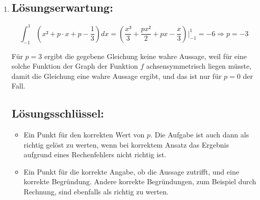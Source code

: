 \begin{langesbeispiel}
{\begin{enumerate}
		Es gilt: $\frac{p²}{4}+1>\frac{p²}{4}$ und somit auch $\sqrt{\frac{p²}{4}+1}>\frac{p}{2}$.
		
		Daraus folgt: $-\frac{p}{2}+\sqrt{\frac{p²}{4}+1}>0$ und $-\frac{p}{2}-\sqrt{\frac{p²}{4}+1}<0 \Rightarrow$ Es gibt immer genau eine positive und eine negative Lösung in $\mathbb{R}$.

	\subsection{Lösungsschlüssel:}
	
\begin{itemize}
	\item Ein Ausgleichspunkt für eine korrekte rechnerische Begründung. 
	\item EEin Punkt für eine (sinngemäß) korrekte Begründung dafür, dass die Parabel genau eine positive und eine negative Nullstelle hat. 
\end{itemize}

\item \subsection{Lösungserwartung:}
			
		$$\int^1_{-1}{\left(x²+p\cdot x+p-\frac{1}{3}\right)}dx=\left(\frac{x³}{3}+\frac{px²}{2}+px-\frac{x}{3}\right)\Bigg|^1_{-1}=-6 \Rightarrow p=-3$$
		
		Für $p=3$ ergibt die gegebene Gleichung keine wahre Aussage, weil für eine solche Funktion der Graph der Funktion $f$ achsensymmetrisch liegen müsste, damit die Gleichung eine wahre Aussage ergibt, und das ist nur für $p=0$ der Fall.

	\subsection{Lösungsschlüssel:}
	
\begin{itemize}
	\item Ein Punkt für den korrekten Wert von $p$. Die Aufgabe ist auch dann als richtig gelöst zu werten, wenn bei korrektem Ansatz das Ergebnis aufgrund eines Rechenfehlers nicht richtig ist. 
	\item  Ein Punkt für die korrekte Angabe, ob die Aussage zutrifft, und eine korrekte Begründung. Andere korrekte Begründungen, zum Beispiel durch Rechnung, sind ebenfalls als richtig zu werten. 
\end{itemize}
\end{enumerate}}
		\end{langesbeispiel}